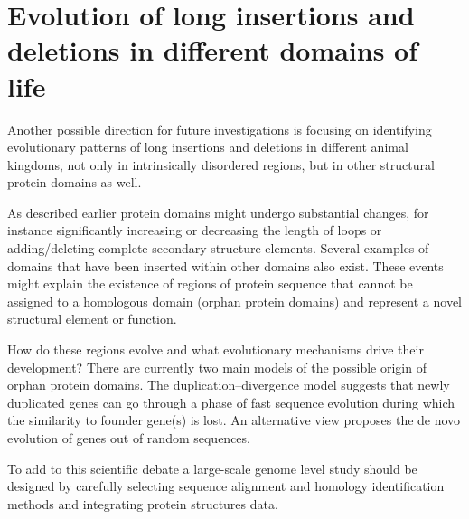 \documentclass[11pt, a4paper,oneside]{report}
\begin{document}
 \section{Evolution of long insertions and deletions in different domains of life}
 Another possible direction for future investigations is focusing on identifying evolutionary patterns of long insertions and deletions in different animal kingdoms, not only in intrinsically disordered regions, but in other structural protein domains as well.  
 
 As described earlier protein domains might undergo substantial changes, for instance significantly increasing or decreasing the length of loops or adding/deleting complete secondary structure elements. Several examples of domains that have been inserted within other domains also exist. These events might explain the existence of regions of protein sequence that cannot be assigned to a homologous domain (orphan protein domains) and represent a novel structural element or function. 
 
 How do these regions evolve and what evolutionary mechanisms drive their development? There are currently two main models of the possible origin of orphan protein domains. The  duplication–divergence model suggests that newly duplicated genes can go through a phase of fast sequence evolution during which the similarity to founder gene(s) is lost\cite{Orengo2005}. An alternative view proposes the de novo evolution of genes out of random sequences\cite{Tautz2011}. 
 
  To add to this scientific debate a large-scale genome level study should be designed by carefully selecting sequence alignment and homology identification methods and integrating protein structures data. 



\end{document}

